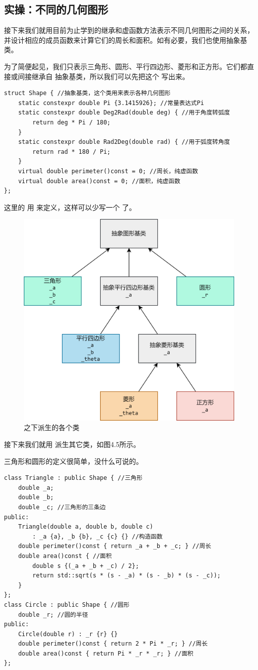 \subsection*{实操：不同的几何图形}
接下来我们就用目前为止学到的继承和虚函数方法表示不同几何图形之间的关系，并设计相应的成员函数来计算它们的周长和面积。如有必要，我们也使用抽象基类。\par
为了简便起见，我们只表示三角形、圆形、平行四边形、菱形和正方形。它们都直接或间接继承自 \lstinline@Shape@ 抽象基类，所以我们可以先把这个 \lstinline@Shape@ 写出来。
\begin{lstlisting}
struct Shape { //抽象基类，这个类用来表示各种几何图形
    static constexpr double Pi {3.1415926}; //常量表达式Pi
    static constexpr double Deg2Rad(double deg) { //用于角度转弧度
        return deg * Pi / 180;
    }
    static constexpr double Rad2Deg(double rad) { //用于弧度转角度
        return rad * 180 / Pi;
    }
    virtual double perimeter()const = 0; //周长，纯虚函数
    virtual double area()const = 0; //面积，纯虚函数
};
\end{lstlisting}
这里的 \lstinline@Shape@ 用 \lstinline@struct@ 来定义，这样可以少写一个 \lstinline@public@ 了。\par\pagebreak
\begin{figure}[htbp]
    \centering
    \includegraphics[width=.6\textwidth]{../images/generalized_parts/10_abstract_shape_class.drawio.png}
    \caption{\lstinline@Shape@ 之下派生的各个类}
\end{figure}
接下来我们就用 \lstinline@Shape@ 派生其它类，如图4.5所示。\par
三角形和圆形的定义很简单，没什么可说的。
\begin{lstlisting}
class Triangle : public Shape { //三角形
    double _a;
    double _b;
    double _c; //三角形的三条边
public:
    Triangle(double a, double b, double c)
        : _a {a}, _b {b}, _c {c} {} //构造函数
    double perimeter()const { return _a + _b + _c; } //周长
    double area()const { //面积
        double s {(_a + _b + _c) / 2};
        return std::sqrt(s * (s - _a) * (s - _b) * (s - _c));
    }
};
class Circle : public Shape { //圆形
    double _r; //圆的半径
public:
    Circle(double r) : _r {r} {}
    double perimeter()const { return 2 * Pi * _r; } //周长
    double area()const { return Pi * _r * _r; } //面积
};
\end{lstlisting}
